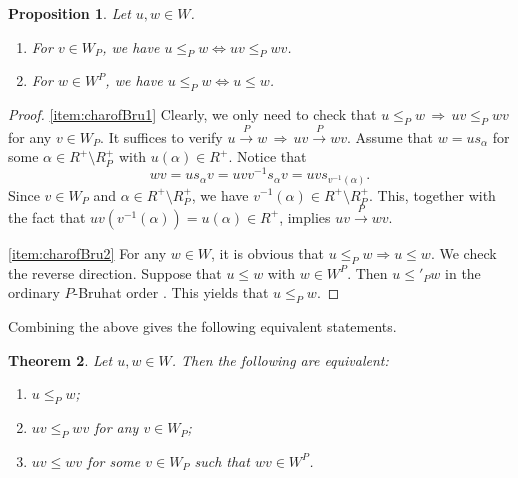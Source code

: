 \documentclass[12pt]{amsart}
\newtheorem{Th}{Theorem}[section]
\newtheorem{Prop}[Th]{Proposition}
\begin{document}
\begin{Prop}\label{prop:charofPBru}
Let $u,w\in W$. 
\begin{enumerate}[\rm\quad (1)]
    \item \label{item:charofBru1}
    For   $v\in W_P$, we have 
    $u\leq_P w\iff uv\leq_P wv$. 
    \item \label{item:charofBru2}
  For  $w\in W^P$, we have 
    $u\leq_P w\iff u\leq w$. 
\end{enumerate}
\end{Prop}
\begin{proof}
\eqref{item:charofBru1}
Clearly, we only need to check that $u\leq_P w\,\Longrightarrow\, uv\leq_P wv$ for any $v\in W_P$. It suffices to verify $u\stackrel{P}\to w\,\Longrightarrow\, uv\stackrel{P}\to wv$.
Assume that 
$w=us_\alpha$ for some $\alpha\in R^+\setminus R_P^+$ with $u(\alpha)\in R^+$. 
Notice that
\[
wv=us_\alpha v=uvv^{-1}s_\alpha v=uvs_{v^{-1}(\alpha)}.
\] 
Since $v\in W_P$ and $\alpha\in R^+\setminus R_P^+$, we have  $v^{-1}(\alpha)\in R^+\setminus R_P^+$. 
This, together with the fact that $uv(v^{-1}(\alpha))=u(\alpha)\in R^+$, implies   $uv\stackrel{P}\to wv$. 

\eqref{item:charofBru2}
For any $w\in W$, it is obvious that 
$u\leq_P w\Longrightarrow u\leq w.$ We check the reverse direction. Suppose that $u\leq w$ with $w\in W^P$. Then  $u\leq'_P w$ in the ordinary    $P$-Bruhat order  \cite[Proposition 2.5]{KLS-Proj}. This yields that  $u\leq_P w$. 
\end{proof}

Combining the above gives the following  equivalent statements.  

\begin{Th}\label{thm:charofPBru}
Let $u,w\in W$. 
Then the following are equivalent:
\begin{enumerate}[\rm \quad (1)]
    \item $u\leq_P w$; 
    \item $uv\leq_P wv$ for any $v\in W_P$; 
    \item $uv\leq wv$ for some $v\in W_P$ such that $wv\in W^P$.
\end{enumerate}
\end{Th}
\end{document}
